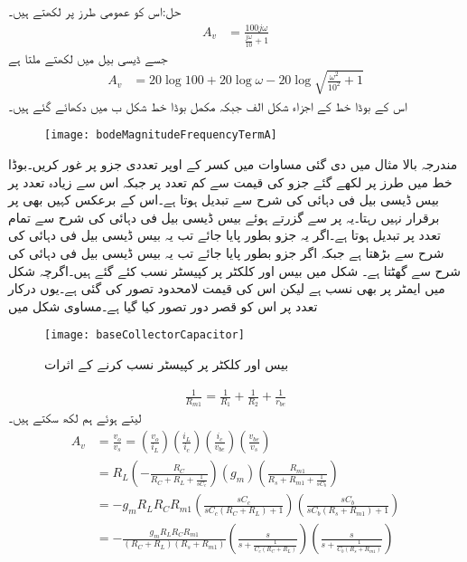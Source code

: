 حل:اس کو عمومی طرز پر لکھتے ہیں۔
\begin{align*}
A_v&=\frac{100 j \omega}{\frac{j \omega}{10}+1}
\end{align*}
جسے ڈیسی بیل میں لکھتے ملتا ہے
\begin{align*}
A_v&=20 \log 100 +20 \log \omega-20 \log \sqrt{\frac{\omega^2}{10^2}+1}
\end{align*}
اس کے بوڈا خط کے اجزاء شکل  الف جبکہ مکمل بوڈا خط شکل  ب میں دکھائے گئے ہیں۔
\begin{figure}
\centering
\texttt{[image: bodeMagnitudeFrequencyTermA]}
\caption{}
\label{شکل_تعددی_ردعمل_تعددی_جزو}
\end{figure}

مندرجہ بالا مثال میں دی گئی مساوات میں کسر کے اوپر تعددی جزو پر غور کریں۔بوڈا خط میں  طرز پر لکھے گئے جزو کی قیمت  سے کم تعدد پر  جبکہ اس سے زیادہ تعدد پر بیس ڈیسی بیل فی دہائی کی شرح سے تبدیل ہوتا ہے۔اس کے برعکس  کہیں بھی  پر برقرار نہیں رہتا۔یہ  پر  سے گزرتے ہوئے بیس ڈیسی بیل فی دہائی کی شرح سے تمام تعدد پر تبدیل ہوتا ہے۔اگر یہ جزو بطور  پایا جائے تب یہ بیس ڈیسی بیل فی دہائی کی شرح سے بڑھتا ہے جبکہ اگر جزو بطور  پایا جائے تب یہ بیس ڈیسی بیل فی دہائی کی شرح سے گھٹتا ہے۔
شکل  میں بیس  اور کلکٹر  پر کپیسٹر نسب کئے گئے ہیں۔اگرچہ شکل میں ایمٹر پر  بھی  نسب ہے لیکن اس کی قیمت لامحدود تصور کی گئی ہے۔یوں درکار تعدد پر اس کو قصر دور تصور کیا گیا ہے۔مساوی شکل میں
\begin{figure}
\centering
\texttt{[image: baseCollectorCapacitor]}
\caption{بیس  اور کلکٹر  پر کپیسٹر نسب کرنے کے اثرات}
\label{شکل_تعددی_ردعمل_قابو_حاصل_کپیسٹر}
\end{figure}
%
\begin{align*}
\frac{1}{R_{m1}}=\frac{1}{R_1}+\frac{1}{R_2}+\frac{1}{r_{be}}
\end{align*}
لیتے ہوئے ہم لکھ سکتے ہیں۔
\begin{align*}
A_v&=\frac{v_o}{v_s}=\left(\frac{v_o}{i_L}\right) \left(\frac{i_L}{i_c}\right) \left( \frac{i_c}{v_{be}}\right) \left( \frac{v_{be}}{v_s} \right)\\
&=R_L \left(-\frac{R_C}{R_C+R_L+\frac{1}{sC_c}} \right) \left(g_m \right) \left(\frac{R_{m1}}{R_s+R_{m1}+\frac{1}{s C_b}}\right)\\
&=-g_m R_L R_C R_{m1} \left(\frac{sC_c}{sC_c \left(R_C+R_L\right)+1}\right) \left(\frac{sC_b}{sC_b \left(R_s+R_{m1} \right)+1} \right)\\
&=-\frac{g_m R_L R_C R_{m1}}{\left(R_C+R_L \right)\left(R_s+R_{m1} \right)}\left(\frac{s}{s+\frac{1}{C_c \left(R_C+R_L\right)}} \right)\left(\frac{s}{s+\frac{1}{C_b \left(R_s+R_{m1} \right)}} \right)
\end{align*} 
